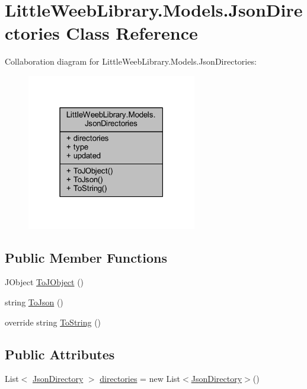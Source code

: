 \hypertarget{class_little_weeb_library_1_1_models_1_1_json_directories}{}\section{Little\+Weeb\+Library.\+Models.\+Json\+Directories Class Reference}
\label{class_little_weeb_library_1_1_models_1_1_json_directories}


Collaboration diagram for Little\+Weeb\+Library.\+Models.\+Json\+Directories\+:\nopagebreak
\begin{figure}[H]
\begin{center}
\leavevmode
\includegraphics[width=210pt]{class_little_weeb_library_1_1_models_1_1_json_directories__coll__graph}
\end{center}
\end{figure}
\subsection*{Public Member Functions}
\begin{DoxyCompactItemize}
\item 
J\+Object \mbox{\hyperlink{class_little_weeb_library_1_1_models_1_1_json_directories_a66a155b005f6c2c19eb95ddd912a64ee}{To\+J\+Object}} ()
\item 
string \mbox{\hyperlink{class_little_weeb_library_1_1_models_1_1_json_directories_a06826e97f8dd170ecad5574cf8ef816a}{To\+Json}} ()
\item 
override string \mbox{\hyperlink{class_little_weeb_library_1_1_models_1_1_json_directories_aef343d105a3881b4c144dc557aaf76dc}{To\+String}} ()
\end{DoxyCompactItemize}
\subsection*{Public Attributes}
\begin{DoxyCompactItemize}
\item 
List$<$ \mbox{\hyperlink{class_little_weeb_library_1_1_models_1_1_json_directory}{Json\+Directory}} $>$ \mbox{\hyperlink{class_little_weeb_library_1_1_models_1_1_json_directories_a370ad019604c1b719b921ea34f8b4f69}{directories}} = new List$<$\mbox{\hyperlink{class_little_weeb_library_1_1_models_1_1_json_directory}{Json\+Directory}}$>$()
\end{DoxyCompactItemize}
